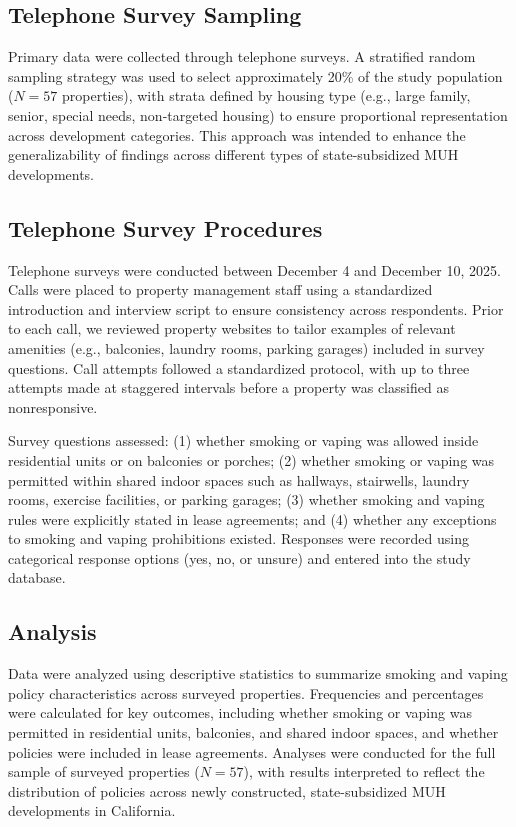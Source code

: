 \documentclass[man]{apa7}
\begin{document}
\subsection{Telephone Survey Sampling}

Primary data were collected through telephone surveys. A stratified random sampling strategy was used to select approximately 20\% of the study population ($N = 57$ properties), with strata defined by housing type (e.g., large family, senior, special needs, non-targeted housing) to ensure proportional representation across development categories. This approach was intended to enhance the generalizability of findings across different types of state-subsidized MUH developments.

\subsection{Telephone Survey Procedures}

Telephone surveys were conducted between December 4 and December 10, 2025. Calls were placed to property management staff using a standardized introduction and interview script to ensure consistency across respondents. Prior to each call, we reviewed property websites to tailor examples of relevant amenities (e.g., balconies, laundry rooms, parking garages) included in survey questions. Call attempts followed a standardized protocol, with up to three attempts made at staggered intervals before a property was classified as nonresponsive.

Survey questions assessed: (1) whether smoking or vaping was allowed inside residential units or on balconies or porches; (2) whether smoking or vaping was permitted within shared indoor spaces such as hallways, stairwells, laundry rooms, exercise facilities, or parking garages; (3) whether smoking and vaping rules were explicitly stated in lease agreements; and (4) whether any exceptions to smoking and vaping prohibitions existed. Responses were recorded using categorical response options (yes, no, or unsure) and entered into the study database.

\subsection{Analysis}

Data were analyzed using descriptive statistics to summarize smoking and vaping policy characteristics across surveyed properties. Frequencies and percentages were calculated for key outcomes, including whether smoking or vaping was permitted in residential units, balconies, and shared indoor spaces, and whether policies were included in lease agreements. Analyses were conducted for the full sample of surveyed properties ($N = 57$), with results interpreted to reflect the distribution of policies across newly constructed, state-subsidized MUH developments in California.
\end{document}

